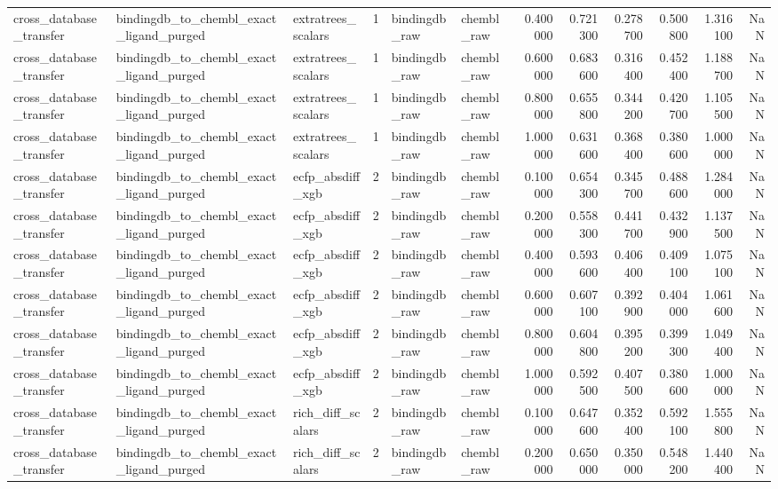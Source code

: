 \begin{longtable}{lllrllrrrrrr}
cross\_database\_transfer & bindingdb\_to\_chembl\_exact\_ligand\_purged & extratrees\_scalars & 1 & bindingdb\_raw & chembl\_raw & 0.400000 & 0.721300 & 0.278700 & 0.500800 & 1.316100 & NaN \\
cross\_database\_transfer & bindingdb\_to\_chembl\_exact\_ligand\_purged & extratrees\_scalars & 1 & bindingdb\_raw & chembl\_raw & 0.600000 & 0.683600 & 0.316400 & 0.452400 & 1.188700 & NaN \\
cross\_database\_transfer & bindingdb\_to\_chembl\_exact\_ligand\_purged & extratrees\_scalars & 1 & bindingdb\_raw & chembl\_raw & 0.800000 & 0.655800 & 0.344200 & 0.420700 & 1.105500 & NaN \\
cross\_database\_transfer & bindingdb\_to\_chembl\_exact\_ligand\_purged & extratrees\_scalars & 1 & bindingdb\_raw & chembl\_raw & 1.000000 & 0.631600 & 0.368400 & 0.380600 & 1.000000 & NaN \\
cross\_database\_transfer & bindingdb\_to\_chembl\_exact\_ligand\_purged & ecfp\_absdiff\_xgb & 2 & bindingdb\_raw & chembl\_raw & 0.100000 & 0.654300 & 0.345700 & 0.488600 & 1.284000 & NaN \\
cross\_database\_transfer & bindingdb\_to\_chembl\_exact\_ligand\_purged & ecfp\_absdiff\_xgb & 2 & bindingdb\_raw & chembl\_raw & 0.200000 & 0.558300 & 0.441700 & 0.432900 & 1.137500 & NaN \\
cross\_database\_transfer & bindingdb\_to\_chembl\_exact\_ligand\_purged & ecfp\_absdiff\_xgb & 2 & bindingdb\_raw & chembl\_raw & 0.400000 & 0.593600 & 0.406400 & 0.409100 & 1.075100 & NaN \\
cross\_database\_transfer & bindingdb\_to\_chembl\_exact\_ligand\_purged & ecfp\_absdiff\_xgb & 2 & bindingdb\_raw & chembl\_raw & 0.600000 & 0.607100 & 0.392900 & 0.404000 & 1.061600 & NaN \\
cross\_database\_transfer & bindingdb\_to\_chembl\_exact\_ligand\_purged & ecfp\_absdiff\_xgb & 2 & bindingdb\_raw & chembl\_raw & 0.800000 & 0.604800 & 0.395200 & 0.399300 & 1.049400 & NaN \\
cross\_database\_transfer & bindingdb\_to\_chembl\_exact\_ligand\_purged & ecfp\_absdiff\_xgb & 2 & bindingdb\_raw & chembl\_raw & 1.000000 & 0.592500 & 0.407500 & 0.380600 & 1.000000 & NaN \\
cross\_database\_transfer & bindingdb\_to\_chembl\_exact\_ligand\_purged & rich\_diff\_scalars & 2 & bindingdb\_raw & chembl\_raw & 0.100000 & 0.647600 & 0.352400 & 0.592100 & 1.555800 & NaN \\
cross\_database\_transfer & bindingdb\_to\_chembl\_exact\_ligand\_purged & rich\_diff\_scalars & 2 & bindingdb\_raw & chembl\_raw & 0.200000 & 0.650000 & 0.350000 & 0.548200 & 1.440400 & NaN \\

\end{longtable}
